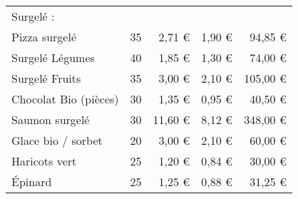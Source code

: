 \documentclass[12pt,a4paper]{report}
\begin{document}
\begin{table}[h]
\begin{tabular}{lrrrr}
					Surgelé :  &       &       & &  \\
					Pizza surgelé  & 35    &                                    2,71 €  &                         1,90 €  &                                 94,85 €  \\
					 Surgelé Légumes  & 40    &                                    1,85 €  &                         1,30 €  &                                 74,00 €  \\
					 Surgelé Fruits & 35    &                                    3,00 €  &                         2,10 €  &                               105,00 €  \\
					Chocolat Bio (pièces)  & 30    &                                    1,35 €  &                         0,95 €  &                                 40,50 €  \\
					 Saumon surgelé  & 30    &                                 11,60 €  &                         8,12 €  &                               348,00 €  \\
					Glace bio / sorbet & 20    &                                    3,00 €  &                         2,10 €  &                                 60,00 €  \\
					Haricots vert  & 25    &                                    1,20 €  &                         0,84 €  &                                 30,00 €  \\
					 Épinard  & 25    &                                    1,25 €  &                         0,88 €  &                                 31,25 €  \\
					\end{tabular}%
				\label{tab:addlabel}%
				\end{table}%
			\newpage
\end{document}
